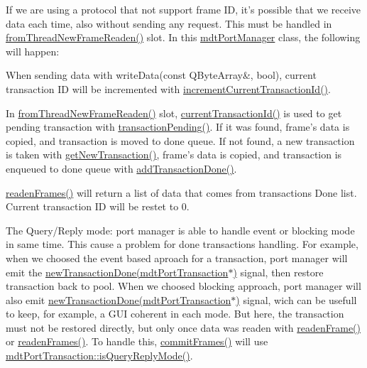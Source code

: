 If we are using a protocol that not support frame ID, it's possible that we receive data each time, also without sending any request. This must be handled in \hyperlink{classmdt_port_manager_a4fcc8f0699b655156e661bb3de6056cc}{fromThreadNewFrameReaden()} slot. In this \hyperlink{classmdt_port_manager}{mdtPortManager} class, the following will happen:
\begin{DoxyItemize}
\item When sending data with writeData(const QByteArray\&, bool), current transaction ID will be incremented with \hyperlink{classmdt_port_manager_a4d009936a0a5130f3bfecb69fee4ce42}{incrementCurrentTransactionId()}.
\item In \hyperlink{classmdt_port_manager_a4fcc8f0699b655156e661bb3de6056cc}{fromThreadNewFrameReaden()} slot, \hyperlink{classmdt_port_manager_a19abf29c8948cde0337d67c9722c25aa}{currentTransactionId()} is used to get pending transaction with \hyperlink{classmdt_port_manager_a18478707a9be7638b06cde48ced48297}{transactionPending()}. If it was found, frame's data is copied, and transaction is moved to done queue. If not found, a new transaction is taken with \hyperlink{classmdt_port_manager_a75ebd3d1859e3ed38b9558981e53aac4}{getNewTransaction()}, frame's data is copied, and transaction is enqueued to done queue with \hyperlink{classmdt_port_manager_a4b584d9005316be9991e6026e4c5e5a4}{addTransactionDone()}.
\item \hyperlink{classmdt_port_manager_addd5dcae9644cea42a9871205af41796}{readenFrames()} will return a list of data that comes from transactions Done list. Current transaction ID will be restet to 0.
\end{DoxyItemize}

The Query/Reply mode: port manager is able to handle event or blocking mode in same time. This cause a problem for done transactions handling. For example, when we choosed the event based aproach for a transaction, port manager will emit the \hyperlink{classmdt_port_manager_a416a24db1048e9f66aef27ea810954d2}{newTransactionDone(mdtPortTransaction$\ast$)} signal, then restore transaction back to pool. When we choosed blocking approach, port manager will also emit \hyperlink{classmdt_port_manager_a416a24db1048e9f66aef27ea810954d2}{newTransactionDone(mdtPortTransaction$\ast$)} signal, wich can be usefull to keep, for example, a GUI coherent in each mode. But here, the transaction must not be restored directly, but only once data was readen with \hyperlink{classmdt_port_manager_a830ae182d06dd6a52c43a7f45b9240ac}{readenFrame()} or \hyperlink{classmdt_port_manager_addd5dcae9644cea42a9871205af41796}{readenFrames()}. To handle this, \hyperlink{classmdt_port_manager_a84d37b380080eb26e56c68424dedd958}{commitFrames()} will use \hyperlink{classmdt_port_transaction_a9da1cc7a191cd21a2e532d277aa3c628}{mdtPortTransaction::isQueryReplyMode()}. 

